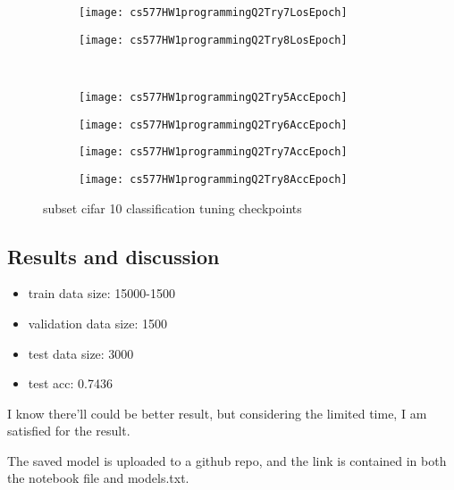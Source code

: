 \documentclass{article}
\begin{document}
\begin{figure}[h!]
\begin{subfigure}{.24\textwidth}
    \end{subfigure}
    \begin{subfigure}{.24\textwidth}
        \centering
        \texttt{[image: cs577HW1programmingQ2Try7LosEpoch]}
    \end{subfigure}
    \begin{subfigure}{.24\textwidth}
        \centering
        \texttt{[image: cs577HW1programmingQ2Try8LosEpoch]}
    \end{subfigure}\\
    \begin{subfigure}{.24\textwidth}
        \centering
        \texttt{[image: cs577HW1programmingQ2Try5AccEpoch]}
    \end{subfigure}
    \begin{subfigure}{.24\textwidth}
        \centering
        \texttt{[image: cs577HW1programmingQ2Try6AccEpoch]}
    \end{subfigure}
    \begin{subfigure}{.24\textwidth}
        \centering
        \texttt{[image: cs577HW1programmingQ2Try7AccEpoch]}
    \end{subfigure}
    \begin{subfigure}{.24\textwidth}
        \centering
        \texttt{[image: cs577HW1programmingQ2Try8AccEpoch]}
    \end{subfigure}
    \caption{subset cifar 10 classification tuning checkpoints}
    \label{fig:cifar10triClass}
\end{figure}


\subsection*{Results and discussion}

\begin{itemize}
    \item train data size: 15000-1500
    \item validation data size: 1500
    \item test data size: 3000
    \item test acc: 0.7436
\end{itemize}

I know there'll could be better result, but considering the limited time, I am satisfied for the result.

The saved model is uploaded to a github repo, and the link is contained in both the notebook file and models.txt.
\end{document}
